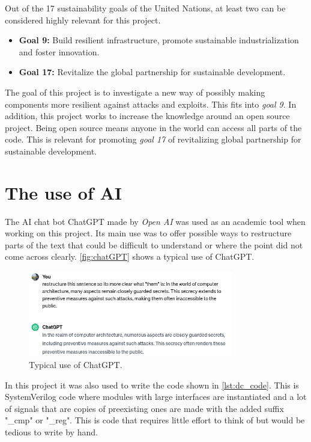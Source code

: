 Out of the 17 sustainability goals of the United Nations\cite{un}, at least two can be considered highly relevant for this project. 

\begin{itemize}
    \item \textbf{Goal 9:} Build resilient infrastructure, promote sustainable industrialization and foster innovation.
    \item \textbf{Goal 17:} Revitalize the global partnership for sustainable development.
\end{itemize}

The goal of this project is to investigate a new way of possibly making components more resilient against attacks and exploits. This fits into \textit{goal 9}. In addition, this project works to increase the knowledge around an open source project. Being open source means anyone in the world can access all parts of the code. This is relevant for promoting \textit{goal 17} of revitalizing global partnership for sustainable development. 

\section{The use of AI}
\label{sec:AI}

The AI chat bot ChatGPT made by \textit{Open AI}\cite{chat} was used as an academic tool when working on this project. Its main use was to offer possible ways to restructure parts of the text that could be difficult to understand or where the point did not come across clearly. \autoref{fig:chatGPT} shows a typical use of ChatGPT.

\begin{figure}[h!]
    \centering
    \includegraphics[width=0.8\textwidth]{docs/images/chat_gpt_use.png}
    \caption{Typical use of ChatGPT.}
    \label{fig:chatGPT}
\end{figure}

In this project it was also used to write the code shown in \autoref{lst:dc_code}. This is SystemVerilog code where modules with large interfaces are instantiated and a lot of signals that are copies of preexisting ones are made with the added suffix "\_cmp" or "\_reg". This is code that requires little effort to think of but would be tedious to write by hand. 